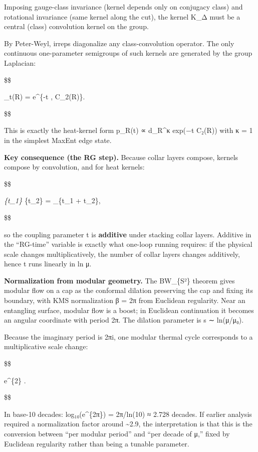 \documentclass[11pt,a4paper]{article}
\theoremstyle{remark}
\begin{document}
Imposing gauge-class invariance (kernel depends only on conjugacy class) and rotational invariance (same kernel along the cut), the kernel K\_Δ must be a central (class) convolution kernel on the group.

By Peter-Weyl, irreps diagonalize any class-convolution operator. The only continuous one-parameter semigroups of such kernels are generated by the group Laplacian:

\$\$

\_t(R) = e\^{}\{-t , C\_2(R)\}.

\$\$

This is exactly the heat-kernel form p\_R(t) ∝ d\_R\^{}κ exp(−t C₂(R)) with κ = 1 in the simplest MaxEnt edge state.

\textbf{Key consequence (the RG step).} Because collar layers compose, kernels compose by convolution, and for heat kernels:

\$\$

\emph{\{t\_1\} \star {}}\{t\_2\} = \_\{t\_1 + t\_2\},

\$\$

so the coupling parameter t is \textbf{additive} under stacking collar layers. Additive in the ``RG-time'' variable is exactly what one-loop running requires: if the physical scale changes multiplicatively, the number of collar layers changes additively, hence t runs linearly in ln μ.

\textbf{Normalization from modular geometry.} The BW\_\{S²\} theorem gives modular flow on a cap as the conformal dilation preserving the cap and fixing its boundary, with KMS normalization β = 2π from Euclidean regularity. Near an entangling surface, modular flow is a boost; in Euclidean continuation it becomes an angular coordinate with period 2π. The dilation parameter is s ∼ ln(μ/μ₀).

Because the imaginary period is 2πi, one modular thermal cycle corresponds to a multiplicative scale change:

\$\$

\mu \mapsto e\^{}\{2\pi\} \mu {} \times \mu.

\$\$

In base-10 decades: log₁₀(e\^{}\{2π\}) = 2π/ln(10) ≈ 2.728 decades. If earlier analysis required a normalization factor around \textasciitilde2.9, the interpretation is that this is the conversion between ``per modular period'' and ``per decade of μ,'' fixed by Euclidean regularity rather than being a tunable parameter.
\end{document}
